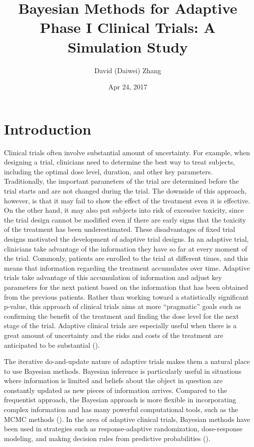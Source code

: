 \documentclass[12pt]{article}
\begin{document}
\setlength{\textheight}{625pt} \setlength{\baselineskip}{23pt}

\title{Bayesian Methods for Adaptive Phase I Clinical Trials: A Simulation Study}
\author{David (Daiwei) Zhang}
\date{Apr 24, 2017}
\maketitle

\noindent

\section{Introduction} \label{secIntro}

Clinical trials often involve substantial amount of uncertainty.
For example, when designing a trial, clinicians need to determine the best way to treat subjects, including the optimal dose level, duration, and other key parameters.
Traditionally, the important parameters of the trial are determined before the trial starts and are not changed during the trial.
The downside of this approach, however, is that it may fail to show the effect of the treatment even it is effective.
On the other hand, it may also put subjects into risk of excessive toxicity, since the trial design cannot be modified even if there are early signs that the toxicity of the treatment has been underestimated.
These disadvantages of fixed trial designs motivated the development of adaptive trial designs.
In an adaptive trial, clinicians take advantage of the information they have so far at every moment of the trial.
Commonly, patients are enrolled to the trial at different times,
and this means that information regarding the treatment accumulates over time.
Adaptive trials take advantage of this accumulation of information and adjust key parameters for the next patient based on the information that has been obtained from the previous patients.
Rather than working toward a statistically significant p-value,
this approach of clinical trials aims at more ``pragmatic'' goals such as confirming the benefit of the treatment and finding the dose level for the next stage of the trial.
Adaptive clinical trials are especially useful when there is a great amount of uncertainty and the risks and costs of the treatment are anticipated to be substantial (\cite{roger}).

The iterative do-and-update nature of adaptive trials makes them a natural place to use Bayesian methods.
Bayesian inference is particularly useful in situations where information is limited and beliefs about the object in question are constantly updated as new pieces of information arrives.
Compared to the frequentist approach, the Bayesian approach is more flexible in incorporating complex information and has many powerful computational tools, such as the MCMC methods (\cite{dunson}).
In the area of adaptive clinical trials, Bayesian methods have been used in strategies such as response-adaptive randomization, dose-response modeling, and making decision rules from predictive probabilities (\cite{roger}).
\end{document}
